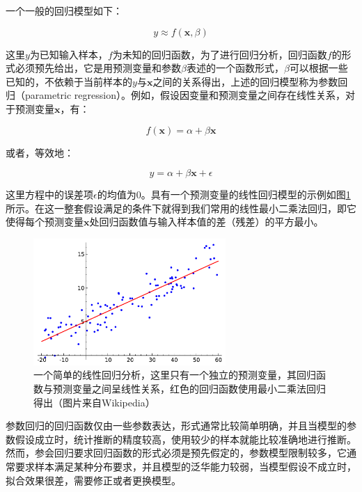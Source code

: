 一个一般的回归模型如下：

\begin{equation}
	y\approx f(\mathbf{x},\beta)
\end{equation}

\noindent 这里$y$为已知输入样本，$f$为未知的回归函数，为了进行回归分析，回归函数$f$的形式必须预先给出，它是用预测变量和参数$\beta$表述的一个函数形式，$\beta$可以根据一些已知的，不依赖于当前样本的$y$与$\mathbf{x}$之间的关系得出，上述的回归模型称为参数回归（parametric regression）。例如，假设因变量和预测变量之间存在线性关系，对于预测变量$\mathbf{x}$，有：

\begin{equation}
	f(\mathbf{x})=\alpha+\beta \mathbf{x}
\end{equation}

\noindent 或者，等效地：

\begin{equation}
	y=\alpha+\beta \mathbf{x}+\epsilon
\end{equation}

\noindent 这里方程中的误差项$\epsilon$的均值为0。具有一个预测变量的线性回归模型的示例如图\ref{f:pt-linear-regression}所示。在这一整套假设满足的条件下就得到我们常用的线性最小二乘法回归，即它使得每个预测变量$\mathbf{x}$处回归函数值与输入样本值的差（残差）的平方最小。

\begin{figure}
	\sidecaption
	\includegraphics[width=0.65\textwidth]{figures/pt/linear-regression}
	\caption{一个简单的线性回归分析，这里只有一个独立的预测变量，其回归函数与预测变量之间呈线性关系，红色的回归函数使用最小二乘法回归得出（图片来自Wikipedia）}
	\label{f:pt-linear-regression}
\end{figure}

参数回归的回归函数仅由一些参数表达，形式通常比较简单明确，并且当模型的参数假设成立时，统计推断的精度较高，使用较少的样本就能比较准确地进行推断。然而，参会回归要求回归函数的形式必须是预先假定的，参数模型限制较多，它通常要求样本满足某种分布要求，并且模型的泛华能力较弱，当模型假设不成立时，拟合效果很差，需要修正或者更换模型。


